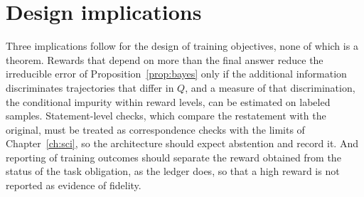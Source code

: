 \section{Design implications}

Three implications follow for the design of training objectives, none of which is a theorem. Rewards that depend on more than the final answer reduce the irreducible error of Proposition~\ref{prop:bayes} only if the additional information discriminates trajectories that differ in $Q$, and a measure of that discrimination, the conditional impurity within reward levels, can be estimated on labeled samples. Statement-level checks, which compare the restatement with the original, must be treated as correspondence checks with the limits of Chapter~\ref{ch:sci}, so the architecture should expect abstention and record it. And reporting of training outcomes should separate the reward obtained from the status of the task obligation, as the ledger does, so that a high reward is not reported as evidence of fidelity.
